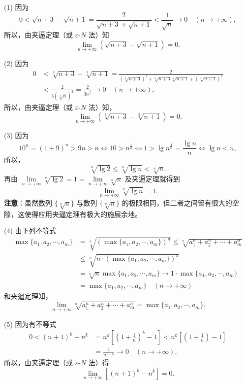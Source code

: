\begin{solution}
(1) 因为
\[
0 < \sqrt{n+3}-\sqrt{n+1} = \frac{2}{\sqrt{n+3}+\sqrt{n+1}} < \frac{1}{\sqrt{n}} \to 0\quad (n\to+\infty),
\]
所以，由夹逼定理（或 $\varepsilon\text{-}N$ 法）知
\[
\lim_{n\to+\infty}(\sqrt{n+3}-\sqrt{n+1}) = 0.
\]

(2) 因为
\begin{align*}
0 &< \sqrt[3]{n+3}-\sqrt[3]{n+1} = \frac{2}{(\sqrt[3]{n+3})^2+\sqrt[3]{n+3}\sqrt[3]{n+1}+(\sqrt[3]{n+1})^2} \\
&< \frac{2}{3(\sqrt[3]{n})^2} = \frac{2}{3n^{\frac{2}{3}}} \to 0\quad (n\to+\infty),
\end{align*}
所以，由夹逼定理（或 $\varepsilon\text{-}N$ 法）知，
\[
\lim_{n\to+\infty}(\sqrt[3]{n+3}-\sqrt[3]{n+1}) = 0.
\]

(3) 因为
\[
10^{n} = (1+9)^{n} > 9n > n \iff 10 > n^{\frac{1}{n}} \iff 1 > \lg n^{\frac{1}{n}} = \frac{\lg n}{n} \iff \lg n < n,
\]
所以，
\[
\sqrt[n]{\lg 2} \leqslant \sqrt[n]{\lg n} < \sqrt[n]{n}.
\]
再由 $\lim\limits_{n\to+\infty}\sqrt[n]{\lg2} = 1 = \lim\limits_{n\to+\infty}\sqrt[n]{n}$ 及夹逼定理就得到
\[
\lim_{n\to+\infty}\sqrt[n]{\lg n} = 1.
\]
\textbf{注意}：虽然数列 $\{\sqrt[n]{a}\}$ 与数列 $\{\sqrt[n]{n}\}$ 的极限相同，但二者之间留有很大的空隙，这使得应用夹逼定理有极大的施展余地。

(4) 由下列不等式
\begin{align*}
\max\{a_{1},a_{2},\cdots,a_{m}\} &= \sqrt[n]{(\max\{a_{1},a_{2},\cdots,a_{m}\})^{n}} \leqslant \sqrt[n]{a_{1}^{n}+a_{2}^{n}+\cdots+a_{m}^{n}} \\
&\leqslant \sqrt[n]{n \cdot (\max\{a_{1},a_{2},\cdots,a_{m}\})^{n}} \\
&= \sqrt[n]{n}\max\{a_{1},a_{2},\cdots,a_{m}\} \to 1 \cdot \max\{a_{1},a_{2},\cdots,a_{m}\} \\
&= \max\{a_{1},a_{2},\cdots,a_{m}\}\quad (n\to+\infty)
\end{align*}
和夹逼定理知，
\[
\lim_{n\to+\infty}\sqrt[n]{a_{1}^{n}+a_{2}^{n}+\cdots+a_{m}^{n}} = \max\{a_{1},a_{2},\cdots,a_{m}\}.
\]

(5) 因为有不等式
\begin{align*}
0 < (n+1)^{k}-n^{k} &= n^{k}\left[\left(1+\frac{1}{n}\right)^{k}-1\right] < n^{k}\left[\left(1+\frac{1}{n}\right)-1\right] \\
&= \frac{1}{n^{1-k}} \to 0\quad (n\to+\infty),
\end{align*}
所以，由夹逼定理（或 $\varepsilon\text{-}N$ 法）得
\[
\lim_{n\to+\infty}[(n+1)^k-n^k] = 0.
\]


\end{solution}
